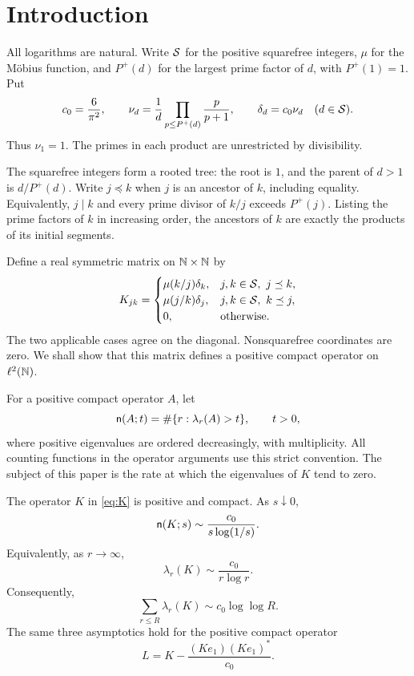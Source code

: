 \section{Introduction}\label{sec:intro}
All logarithms are natural. Write $\mathcal S$ for the positive squarefree integers,
$\mu$ for the M\"obius function, and $P^+(d)$ for the largest prime factor of
$d$, with $P^+(1)=1$. Put
\[
 c_0=\frac{6}{\pi^2},\qquad
 \nu_d=\frac1d\prod_{p\le P^+(d)}\frac{p}{p+1},\qquad
 \delta_d=c_0\nu_d\quad(d\in\mathcal S).
\]
Thus $\nu_1=1$. The primes in each product are unrestricted by divisibility.

The squarefree integers form a rooted tree: the root is $1$, and the parent
of $d>1$ is $d/P^+(d)$. Write $j\preceq k$ when $j$ is an ancestor of $k$,
including equality. Equivalently, $j\mid k$ and every prime divisor of $k/j$
exceeds $P^+(j)$. Listing the prime factors of $k$ in increasing order, the
ancestors of $k$ are exactly the products of its initial segments.

Define a real symmetric matrix on $\mathbb N\times\mathbb N$ by
\begin{equation}\label{eq:K}
 K_{jk}=
 \begin{cases}
 \mu(k/j)\delta_k,&j,k\in\mathcal S,\ j\preceq k,\\
 \mu(j/k)\delta_j,&j,k\in\mathcal S,\ k\preceq j,\\
 0,&\text{otherwise}.
 \end{cases}
\end{equation}
The two applicable cases agree on the diagonal. Nonsquarefree coordinates
are zero. We shall show that this matrix defines a positive compact operator
on $\ell^2(\mathbb N)$.

For a positive compact operator $A$, let
\[
 \mathsf n(A;t)=\#\{r:\lambda_r(A)>t\},\qquad t>0,
\]
where positive eigenvalues are ordered decreasingly, with multiplicity.
All counting functions in the operator arguments use this strict convention.
The subject of this paper is the rate at which the eigenvalues of $K$ tend
to zero.

\begin{theorem}\label{thm:main}
The operator $K$ in \eqref{eq:K} is positive and compact. As $s\downarrow0$,
\begin{equation}\label{eq:maincount}
 \mathsf n(K;s)\sim\frac{c_0}{s\log(1/s)}.
\end{equation}
Equivalently, as $r\to\infty$,
\begin{equation}\label{eq:maineigen}
 \lambda_r(K)\sim\frac{c_0}{r\log r}.
\end{equation}
Consequently,
\[
 \sum_{r\le R}\lambda_r(K)\sim c_0\log\log R.
\]
The same three asymptotics hold for the positive compact operator
\begin{equation}\label{eq:deflation}
 L=K-\frac{(Ke_1)(Ke_1)^*}{c_0}.
\end{equation}
\end{theorem}

